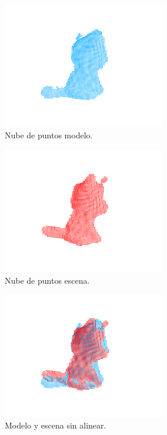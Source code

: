 \begin{figure}[h]
    \centering
    \begin{subfigure}[t]{0.33\textheight}
    	\centering
        \includegraphics[height=5.5cm]{archivos/experimentacion-1-modelo.png}
        \caption{Nube de puntos modelo.}
    \end{subfigure}
    \begin{subfigure}[t]{0.33\textheight}
    	\centering
        \includegraphics[height=5.5cm]{archivos/experimentacion-1-escena.png}
        \caption{Nube de puntos escena.}
    \end{subfigure}
    \begin{subfigure}[t]{0.33\textheight}
    	\centering
        \includegraphics[height=5.5cm]{archivos/experimentacion-1-modelo-escena.png}
        \caption{Modelo y escena sin alinear.}
    \end{subfigure}
    \begin{subfigure}[t]{0.33\textheight}

\end{subfigure}
\end{figure}
